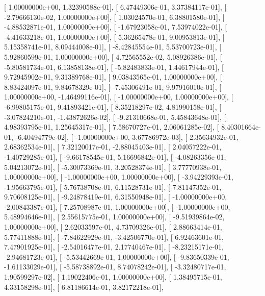 \documentclass{article}
\begin{document}
       [  1.00000000e+00,   1.32390588e-01],
       [  6.47449306e-01,   3.37384117e-01],
       [ -2.79666130e-02,   1.00000000e+00],
       [  1.03024570e-01,   6.38801580e-01],
       [ -4.88532871e-01,   1.00000000e+00],
       [ -1.67923058e-01,   7.53974022e-01],
       [ -4.41633218e-01,   1.00000000e+00],
       [  5.36265478e-01,   9.00953813e-01],
       [  5.15358741e-01,   8.09444008e-01],
       [ -8.42845554e-01,   5.53700723e-01],
       [  5.92860599e-01,   1.00000000e+00],
       [  4.72565552e-02,   5.08926386e-01],
       [ -5.80581734e-01,   6.13858138e-01],
       [ -5.82483833e-01,   1.44617944e-01],
       [  9.72945902e-01,   9.31389768e-01],
       [  9.03843565e-01,   1.00000000e+00],
       [  8.83424097e-01,   9.84678329e-01],
       [ -7.45306491e-01,   9.97916010e-01],
       [  1.00000000e+00,  -1.46499116e-01],
       [ -1.00000000e+00,   1.00000000e+00],
       [ -6.99805175e-01,   9.41893421e-01],
       [  8.35218297e-02,   4.81990158e-01],
       [ -3.07824210e-01,  -1.43872626e-02],
       [ -9.21310668e-01,   5.45843648e-01],
       [  4.98393795e-01,   1.25645317e-01],
       [  7.58670727e-01,   2.06061285e-02],
       [  8.40301664e-01,  -6.40494779e-02],
       [ -1.00000000e+00,   3.67786972e-03],
       [  2.35634932e-01,   2.68362534e-01],
       [  7.32120017e-01,  -2.88045403e-01],
       [  2.04057222e-01,  -1.40729285e-01],
       [ -9.66178545e-01,   5.16696842e-01],
       [ -4.08263356e-01,   5.04213072e-01],
       [ -5.30073369e-01,   3.20528374e-01],
       [  3.77770938e-01,   1.00000000e+00],
       [ -1.00000000e+00,   1.00000000e+00],
       [ -3.94229393e-01,  -1.95663795e-01],
       [  5.76738708e-01,   6.11528731e-01],
       [  7.81147352e-01,   9.70608125e-01],
       [ -9.24878419e-01,   6.31550948e-01],
       [ -1.00000000e+00,  -2.00843387e-01],
       [  7.25708987e-01,   1.00000000e+00],
       [ -1.00000000e+00,   5.48994646e-01],
       [  2.55615775e-01,   1.00000000e+00],
       [ -9.51939864e-02,   1.00000000e+00],
       [  2.62033597e-01,   4.73709326e-01],
       [  2.88663414e-01,   5.77411888e-01],
       [ -7.84622929e-01,  -3.42506770e-01],
       [  6.92463601e-01,   7.47901925e-01],
       [ -2.54016477e-01,   2.17740467e-01],
       [ -8.23215171e-01,  -2.94681723e-01],
       [ -5.53442669e-01,   1.00000000e+00],
       [ -9.83650339e-01,  -1.61133029e-01],
       [ -5.58738892e-01,   8.74078242e-01],
       [ -3.32480717e-01,   1.90599297e-02],
       [  1.19022406e-01,   1.00000000e+00],
       [  1.38495715e-01,   4.33158298e-01],
       [  6.81186614e-01,   3.82172218e-01],
\end{document}

